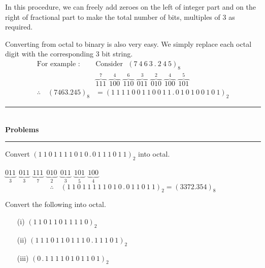 In this procedure, we can freely add zeroes on the left of integer part and on the right of fractional part to make the total number of bits, multiples of 3 as required.

\medskip
{}

Converting from octal to binary is also very easy. We simply replace each octal digit with the corresponding 3 bit string.
\begin{align*}
\text{For example~:~} & \text{Consider~ } (7~4~6~3~.~2~4~5)_{8}\\[3pt]
                      & \overbrace{111}^{7} \ \ \overbrace{100}^{4} \ \ \overbrace{110}^{6} \ \ \overbrace{011}^{3} \ \ \overbrace{010}^{2} \ \ \overbrace{100}^{4} \ \ \overbrace{101}^{5}\\[3pt]
\therefore\quad (7463.245)_{8} &= (1~1~1~1~0~0~1~1~0~0~1~1\,.\,0~1~0~1~0~0~1~0~1)_{2}
\end{align*}

\begin{center}
\rule{4cm}{1pt}\\
{\bf\Large Problems}\\[-3pt]
\rule{4cm}{1pt}
\end{center}

\begin{problem}\label{prob5.18}
Convert $(1~1~0~1~1~1~1~0~1~0\,.\,0~1~1~1~0~1~1)_{2}$ into octal.
\end{problem}

\begin{solution}
$\underbrace{011}_{3} \ \ \underbrace{011}_{3} \ \ \underbrace{111}_{7} \ \ \underbrace{010}_{2} \ \ \underbrace{011}_{3} \ \ \underbrace{101}_{5} \ \ \underbrace{100}_{4}$
$$
\therefore\quad (1~1~0~1~1~1~1~1~0~1~0\,.\,0~1~1~0~1~1)_{2}=(3372.354)_{8}
$$
\end{solution}

\begin{problem}\label{prob5.19}
Convert the following into octal.
\begin{itemize}
\item[(i)] $(1~1~0~1~1~0~1~1~1~1~0)_{2}$

\item[(ii)] $(1~1~1~0~1~1~0~1~1~1~0\,.\,1~1~1~0~1)_{2}$

\item[(iii)] $(0\,.\,1~1~1~1~0~1~0~1~1~0~1)_{2}$
\end{itemize}
\end{problem}


